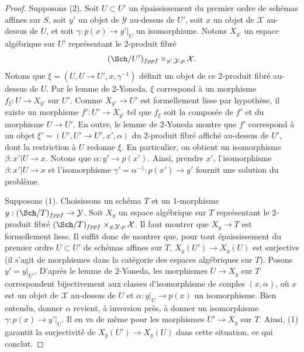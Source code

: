 \begin{proof}
Supposons (2). Soit $U \subset U'$ un épaississement du premier ordre
de schémas affines sur $S$, soit $y'$ un objet de $\mathcal{Y}$
au-dessus de $U'$, soit $x$ un objet de $\mathcal{X}$ au-dessus de $U$,
et soit $\gamma : p(x) \to y'|_U$ un isomorphisme. Notons
$X_{y'}$ un espace algébrique sur $U'$ représentant le $2$-produit
fibré
$$
(\Sch/U')_{fppf} \times_{y', \mathcal{Y}, p} \mathcal{X}.
$$
Notons que $\xi = (U, U \to U', x, \gamma^{-1})$ définit un objet de
ce $2$-produit fibré au-dessus de $U$. Par le lemme de $2$-Yoneda, $\xi$ correspond
à un morphisme $f_\xi : U \to X_{y'}$ sur $U'$. Comme $X_{y'} \to U'$ est
formellement lisse par hypothèse, il existe un morphisme
$f' : U' \to X_{y'}$ tel que $f_\xi$ soit la composée de $f'$
et du morphisme $U \to U'$. En outre, le lemme de $2$-Yoneda montre que
$f'$ correspond à un objet $\xi' = (U', U' \to U', x', \alpha)$ du
$2$-produit fibré affiché au-dessus de $U'$, dont la restriction à
$U$ redonne $\xi$. En particulier, on obtient un isomorphisme
$\beta : x'|U \to x$. Notons que $\alpha : y' \to p(x')$.
Ainsi, prendre $x'$, l'isomorphisme
$\beta : x'|U \to x$ et l'isomorphisme
$\gamma' = \alpha^{-1} : p(x') \to y'$
fournit une solution du problème.

\medskip\noindent
Supposons (1). Choisissons un schéma $T$ et un $1$-morphisme
$y : (\Sch/T)_{fppf} \to \mathcal{Y}$. Soit
$X_y$ un espace algébrique sur $T$ représentant le $2$-produit fibré
$(\Sch/T)_{fppf} \times_{y, \mathcal{Y}, p} \mathcal{X}$.
Il faut montrer que $X_y \to T$ est formellement lisse.
Il suffit donc de montrer que, pour tout épaississement du premier ordre
$U \subset U'$ de schémas affines sur $T$,
$X_y(U') \to X_y(U)$ est surjective (il s'agit de morphismes dans la
catégorie des espaces algébriques sur $T$). Posons $y' = y|_{U'}$.
D'après le lemme de $2$-Yoneda, les morphismes $U \to X_y$ sur $T$ correspondent bijectivement
aux classes d'isomorphisme de couples $(x, \alpha)$, où $x$ est un objet
de $\mathcal{X}$ au-dessus de $U$ et $\alpha : y|_U \to p(x)$ un isomorphisme.
Bien entendu, donner $\alpha$ revient, à inversion près, à donner
un isomorphisme $\gamma : p(x) \to y'|_U$.
Il en va de même pour les morphismes $U' \to X_y$ sur $T$. Ainsi, (1) garantit
la surjectivité de $X_y(U') \to X_y(U)$
dans cette situation, ce qui conclut.
\end{proof}








